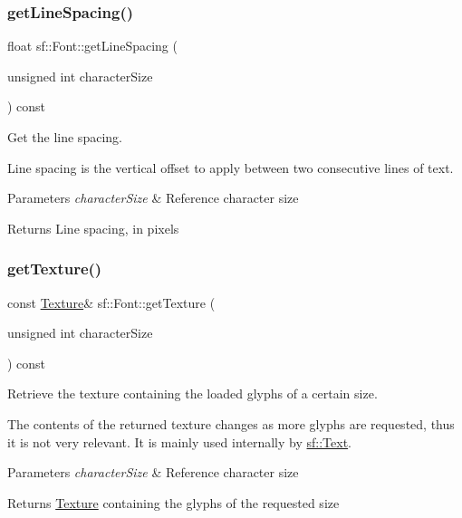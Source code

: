 \subsubsection{\texorpdfstring{get\+Line\+Spacing()}{getLineSpacing()}}
{\footnotesize\ttfamily float sf\+::\+Font\+::get\+Line\+Spacing (\begin{DoxyParamCaption}\item[{unsigned int}]{character\+Size }\end{DoxyParamCaption}) const}



Get the line spacing. 

Line spacing is the vertical offset to apply between two consecutive lines of text.


\begin{DoxyParams}{Parameters}
{\em character\+Size} & Reference character size\\
\hline
\end{DoxyParams}
\begin{DoxyReturn}{Returns}
Line spacing, in pixels 
\end{DoxyReturn}
\mbox{\label{classsf_1_1_font_a15528d289f91cfd4b2597f8a9423e612}} 
\subsubsection{\texorpdfstring{get\+Texture()}{getTexture()}}
{\footnotesize\ttfamily const \hyperlink{classsf_1_1_texture}{Texture}\& sf\+::\+Font\+::get\+Texture (\begin{DoxyParamCaption}\item[{unsigned int}]{character\+Size }\end{DoxyParamCaption}) const}



Retrieve the texture containing the loaded glyphs of a certain size. 

The contents of the returned texture changes as more glyphs are requested, thus it is not very relevant. It is mainly used internally by \hyperlink{classsf_1_1_text}{sf\+::\+Text}.


\begin{DoxyParams}{Parameters}
{\em character\+Size} & Reference character size\\
\hline
\end{DoxyParams}
\begin{DoxyReturn}{Returns}
\hyperlink{classsf_1_1_texture}{Texture} containing the glyphs of the requested size 
\end{DoxyReturn}
\mbox{\label{classsf_1_1_font_a726a55f40c19ac108e348b103190caad}} 
